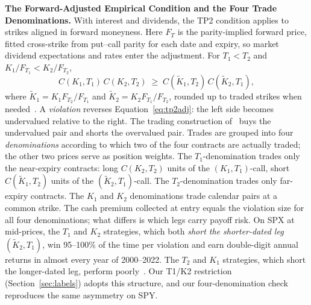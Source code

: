 \documentclass[sigconf,review]{acmart}
\begin{document}
\medskip\noindent\textbf{The Forward-Adjusted Empirical Condition and the Four Trade Denominations.}
\label{sec:denominations}
With interest and dividends, the TP2 condition applies to strikes aligned in forward moneyness. Here $F_T$ is the parity-implied forward price, fitted cross-strike from put--call parity for each date and expiry, so market dividend expectations and rates enter the adjustment. For $T_1<T_2$ and $K_1/F_{T_1}<K_2/F_{T_2}$,
\begin{equation}
C(K_1,T_1)\,C(K_2,T_2)\;\ge\;C(\tilde K_1,T_2)\,C(\tilde K_2,T_1),
\label{eq:tp2adj}
\end{equation}
where $\tilde K_1=K_1 F_{T_2}/F_{T_1}$ and $\tilde K_2=K_2 F_{T_1}/F_{T_2}$, rounded up to traded strikes when needed~\cite{glasserman2025tp2}. A \emph{violation} reverses Equation~\eqref{eq:tp2adj}: the left side becomes undervalued relative to the right. The trading construction of~\cite{glasserman2025tp2} buys the undervalued pair and shorts the overvalued pair. Trades are grouped into four \emph{denominations} according to which two of the four contracts are actually traded; the other two prices serve as position weights. The $T_1$-denomination trades only the near-expiry contracts: long $C(K_2,T_2)$ units of the $(K_1,T_1)$-call, short $C(\tilde K_1,T_2)$ units of the $(\tilde K_2,T_1)$-call. The $T_2$-denomination trades only far-expiry contracts. The $K_1$ and $K_2$ denominations trade calendar pairs at a common strike. The cash premium collected at entry equals the violation size for all four denominations; what differs is which legs carry payoff risk. On SPX at mid-prices, the $T_1$ and $K_2$ strategies, which both \emph{short the shorter-dated leg} $(\tilde K_2,T_1)$, win 95--100\% of the time per violation and earn double-digit annual returns in almost every year of 2000--2022. The $T_2$ and $K_1$ strategies, which short the longer-dated leg, perform poorly~\cite{glasserman2025tp2}. Our T1/K2 restriction (Section~\ref{sec:labels}) adopts this structure, and our four-denomination check reproduces the same asymmetry on SPY.
\end{document}
